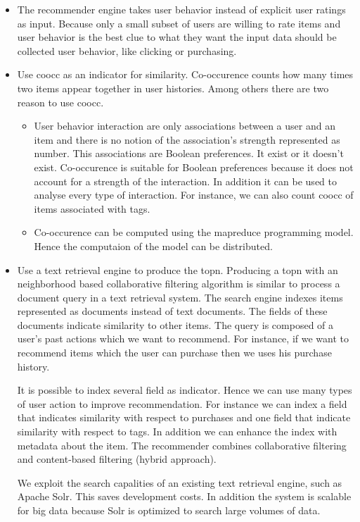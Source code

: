 \begin{itemize}
\item The recommender engine takes user behavior instead of explicit user ratings as input. Because only a small subset of users are willing to rate items and user behavior is the best clue to what they want the input data should be collected user behavior, like clicking or purchasing.

\item Use \gls{coocc} as an \gls{indicator} for similarity. Co-occurence counts how many times two items appear together in user histories. Among others there are two reason to use \gls{coocc}. 

\begin{itemize}
  \item User behavior interaction are only associations between a user and an item and there is no notion of the association's strength represented as number. This associations are Boolean preferences. It exist or it doesn't exist. Co-occurence is suitable for Boolean preferences because it does not account for a strength of the interaction. In addition it can be used to analyse every type of interaction. For instance, we can also count \gls{coocc} of items associated with tags.
  \item Co-occurence can be computed using the \gls{mapreduce} programming model. Hence the computaion of the model can be distributed.
\end{itemize}

\item Use a text retrieval engine to produce the \gls{topn}. Producing a \gls{topn} with an neighborhood based collaborative filtering algorithm is similar to process a document query in a text retrieval system. The search engine indexes items represented as documents instead of text documents. The fields of these documents indicate similarity to other items. The query is composed of a user's past actions which we want to recommend. For instance, if we want to recommend items which the user can purchase then we uses his purchase history. 

It is possible to index several field as indicator. Hence we can use many types of user action to improve recommendation. For instance we can index a field that indicates similarity with respect to purchases and one field that indicate similarity with respect to \glspl{tag}. In addition we can enhance the index with metadata about the item. The recommender combines collaborative filtering and content-based filtering (hybrid approach).

We exploit the search capalities of an existing text retrieval engine, such as Apache Solr. This saves development costs. In addition the system is \gls{scalable} for big data because Solr is optimized to search large volumes of data.

\end{itemize}


